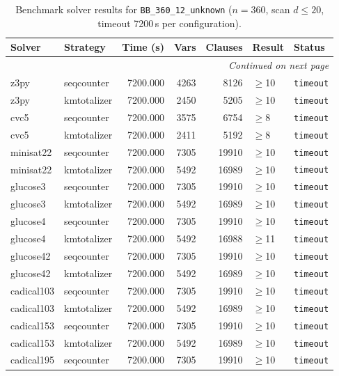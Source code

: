 \begin{longtable}{llrrrl p{}}
\caption{Benchmark solver results for \texttt{BB\_360\_12\_unknown} ($n=360$, scan $d \leq 20$, timeout 7200\,s per configuration).} \label{tab:bench-BB_360_12_unknown} \\
\toprule
Solver & Strategy & Time (s) & Vars & Clauses & Result & Status \\
\midrule
\endhead
\midrule
\multicolumn{7}{r}{\textit{Continued on next page}} \\
\midrule
\endfoot
\bottomrule
\endlastfoot
z3py & seqcounter & 7200.000 & 4263 & 8126 & $\geq$10 & \texttt{timeout} \\
z3py & kmtotalizer & 7200.000 & 2450 & 5205 & $\geq$10 & \texttt{timeout} \\
cvc5 & seqcounter & 7200.000 & 3575 & 6754 & $\geq$8 & \texttt{timeout} \\
cvc5 & kmtotalizer & 7200.000 & 2411 & 5192 & $\geq$8 & \texttt{timeout} \\
minisat22 & seqcounter & 7200.000 & 7305 & 19910 & $\geq$10 & \texttt{timeout} \\
minisat22 & kmtotalizer & 7200.000 & 5492 & 16989 & $\geq$10 & \texttt{timeout} \\
glucose3 & seqcounter & 7200.000 & 7305 & 19910 & $\geq$10 & \texttt{timeout} \\
glucose3 & kmtotalizer & 7200.000 & 5492 & 16989 & $\geq$10 & \texttt{timeout} \\
glucose4 & seqcounter & 7200.000 & 7305 & 19910 & $\geq$10 & \texttt{timeout} \\
glucose4 & kmtotalizer & 7200.000 & 5492 & 16988 & $\geq$11 & \texttt{timeout} \\
glucose42 & seqcounter & 7200.000 & 7305 & 19910 & $\geq$10 & \texttt{timeout} \\
glucose42 & kmtotalizer & 7200.000 & 5492 & 16989 & $\geq$10 & \texttt{timeout} \\
cadical103 & seqcounter & 7200.000 & 7305 & 19910 & $\geq$10 & \texttt{timeout} \\
cadical103 & kmtotalizer & 7200.000 & 5492 & 16989 & $\geq$10 & \texttt{timeout} \\
cadical153 & seqcounter & 7200.000 & 7305 & 19910 & $\geq$10 & \texttt{timeout} \\
cadical153 & kmtotalizer & 7200.000 & 5492 & 16989 & $\geq$10 & \texttt{timeout} \\
cadical195 & seqcounter & 7200.000 & 7305 & 19910 & $\geq$10 & \texttt{timeout} \\

\end{longtable}
